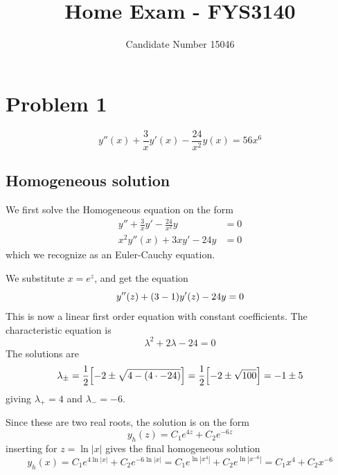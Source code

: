 \documentclass[10pt,a4paper]{article}
\renewcommand{\exp}{e^}
\begin{document}
\title{Home Exam - FYS3140}
\author{Candidate Number 15046}
\maketitle

\section*{Problem 1}
\begin{equation}
    y''(x) + \frac{3}{x}y'(x) - \frac{24}{x^2}y(x) = 56x^6
\end{equation}

\subsection*{Homogeneous solution}
We first solve the Homogeneous equation on the form
\begin{align}
    y'' + \frac{3}{x}y' - \frac{24}{x^2}y &= 0 \\
    x^2 y''(x) + 3xy' - 24y &= 0
\end{align}
which we recognize as an Euler-Cauchy equation.

We substitute $x = \exp{z}$, and get the equation
\begin{equation}
    y''(z) + (3-1)y'(z) - 24y = 0 \\
\end{equation}
This is now a linear first order equation with constant coefficients. The characteristic equation is
\begin{equation}
    \lambda^2 + 2\lambda - 24 = 0
\end{equation}
The solutions are
\begin{equation}
    \lambda_\pm = \frac{1}{2}\qty[-2 \pm \sqrt{4-(4\cdot-24)} ] = \frac{1}{2}\qty[-2\pm \sqrt{100}] = -1\pm 5
\end{equation}
giving $\lambda_+ = 4$ and $\lambda_- = -6$.

Since these are two real roots, the solution is on the form
\begin{equation}
    y_h(z) = C_1\exp{4z} + C_2\exp{-6z}
\end{equation}
inserting for $z = \ln|x|$ gives the final homogeneous solution
\begin{equation}
    y_h(x) = C_1\exp{4\ln|x|} + C_2\exp{-6\ln|x|} = C_1\exp{\ln|x^4|} + C_2\exp{\ln|x^{-6}|} = C_1 x^4 + C_2 x^{-6}
\end{equation}
\end{document}
